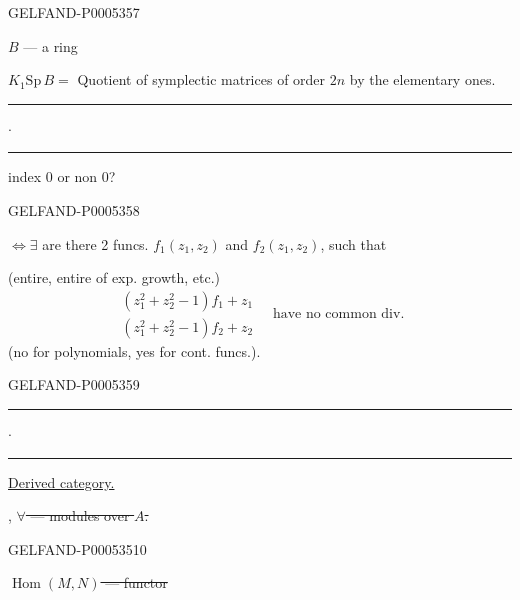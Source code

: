 \begin{GelfandAdjacentEvidence}{GELFAND-P000535}{7}


$B$ — a ring

$K_1\mathrm{Sp}\,B=$ Quotient of symplectic matrices of order $2n$ by the elementary ones.

\hfill\rule{1cm}{.35pt}\enspace\(\cdot\)\enspace\rule{1.2cm}{.35pt}\par

\qquad{}
\qquad index $0$ or non $0$?
\end{GelfandAdjacentEvidence}
\begin{GelfandAdjacentEvidence}{GELFAND-P000535}{8}


$\Longleftrightarrow\exists$ are there 2 funcs. $f_1(z_1,z_2)$ and $f_2(z_1,z_2)$, such that

(entire, entire of exp. growth, etc.)
\[
\begin{gathered}
(z_1^2+z_2^2-1)f_1+z_1\\
(z_1^2+z_2^2-1)f_2+z_2
\end{gathered}
\quad\text{have no common div.}
\]
(no for polynomials, yes for cont. funcs.).
\end{GelfandAdjacentEvidence}
\begin{GelfandAdjacentEvidence}{GELFAND-P000535}{9}


\hfill\rule{1.4cm}{.35pt}\enspace\(\cdot\)\enspace\rule{1.3cm}{.35pt}\par

\qquad\uline{Derived category.}

,
\sout{\mbox{$\forall$} — modules over \mbox{$A$}.}
\end{GelfandAdjacentEvidence}
\begin{GelfandAdjacentEvidence}{GELFAND-P000535}{10}


\sout{\mbox{$\operatorname{Hom}(M,N)$} — functor}
\end{GelfandAdjacentEvidence}
